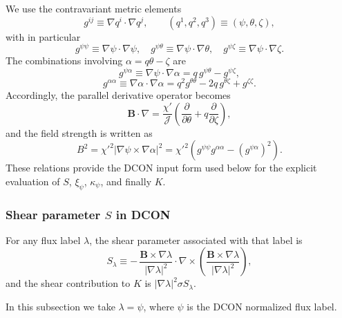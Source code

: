 \documentclass[10pt,a4paper]{article}
\numberwithin{equation}{section}
\begin{document}
We use the contravariant metric elements
\begin{equation}
g^{ij}\equiv \nabla q^i\cdot\nabla q^j,
\qquad
(q^1,q^2,q^3) \equiv (\psi,\theta,\zeta),
\end{equation}
with in particular
\begin{equation}
g^{\psi\psi}\equiv \nabla\psi\cdot\nabla\psi, \quad
g^{\psi\theta}\equiv \nabla\psi\cdot\nabla\theta, \quad
g^{\psi\zeta}\equiv \nabla\psi\cdot\nabla\zeta.
\end{equation}
The combinations involving $\alpha=q\theta-\zeta$ are
\begin{equation}
g^{\psi\alpha}\equiv \nabla\psi\cdot\nabla\alpha
= q\,g^{\psi\theta}-g^{\psi\zeta},
\end{equation}
\begin{equation}
g^{\alpha\alpha}\equiv \nabla\alpha\cdot\nabla\alpha
= q^2 g^{\theta\theta}-2q\,g^{\theta\zeta}+g^{\zeta\zeta}.
\end{equation}
Accordingly, the parallel derivative operator becomes
\begin{equation}
\mathbf B\cdot\nabla
=
\frac{\chi'}{\mathcal J}
\left(
\frac{\partial}{\partial\theta}
+
q\frac{\partial}{\partial\zeta}
\right),
\end{equation}
and the field strength is written as
\begin{equation}
\boxed{
B^2
=
\chi'^2|\nabla\psi\times\nabla\alpha|^2
=
\chi'^2\left(g^{\psi\psi}g^{\alpha\alpha}-(g^{\psi\alpha})^2\right).
}
\end{equation}
These relations provide the DCON input form used below for the explicit evaluation of
$S$, $\xi_\psi$, $\kappa_\psi$, and finally $K$.

\subsubsection{Shear parameter $S$ in DCON}

\color{blue}
For any flux label $\lambda$, the shear parameter associated with that label is
\begin{equation}
S_{\lambda}
\equiv
-\,
\frac{\mathbf B\times\nabla\lambda}{|\nabla\lambda|^2}
\cdot
\nabla\times
\left(
\frac{\mathbf B\times\nabla\lambda}{|\nabla\lambda|^2}
\right),
\end{equation}
and the shear contribution to $K$ is $|\nabla\lambda|^2\sigma S_{\lambda}$.

\color{black}
In this subsection we take $\lambda=\psi$, where $\psi$ is the DCON normalized flux label.
\end{document}
